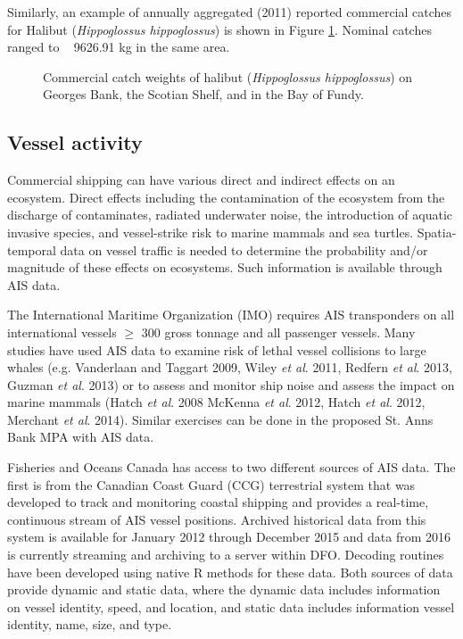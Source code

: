 \documentclass[letterpaper,portrait,11pt]{scrartcl}
\numberwithin{equation}{section}		%
\numberwithin{figure}{section}		%
\numberwithin{table}{section}				%
\newcommand{\ecomod}{\string~/ecomod_data/}   %
\newcommand{\sab}{\ecomod/mpa/sab/}   %
\begin{document}
Similarly, an example of annually aggregated (2011) reported commercial catches for Halibut (\textit{Hippoglossus hippoglossus}) is shown in Figure \ref{fig:halibut}.  Nominal catches ranged to ~ 9626.91 kg in the same area.



\begin{figure}[h]
	\label{fig:halibut}
	\centering
	\caption{Commercial catch weights of halibut (\textit{Hippoglossus hippoglossus}) on Georges Bank, the Scotian Shelf, and in the Bay of Fundy.}
\end{figure}



\clearpage

\subsection{Vessel activity}

Commercial shipping can have various direct and indirect effects on an ecosystem. Direct effects including the contamination of the ecosystem from the discharge of contaminates, radiated underwater noise, the introduction of aquatic invasive species, and vessel-strike risk to marine mammals and sea turtles.  Spatia-temporal data on vessel traffic is needed to determine the probability and/or magnitude of these effects on ecosystems.  Such information is available through AIS data.  

The International Maritime Organization (IMO) requires AIS transponders on all international vessels $\geq$ 300 gross tonnage and all passenger vessels.  Many studies have used AIS data to examine risk of lethal vessel collisions to large whales (e.g. Vanderlaan and Taggart 2009, Wiley \textit{et al}. 2011, Redfern \textit{et al}. 2013,  Guzman \textit{et al}. 2013) or to assess and monitor ship noise and assess the impact on marine mammals (Hatch \textit{et al}. 2008 McKenna \textit{et al}. 2012,  Hatch \textit{et al}. 2012, Merchant \textit{et al}. 2014).    Similar exercises can be done in the proposed St. Anns Bank MPA with AIS data. 

Fisheries and Oceans Canada has access to two different sources of AIS data.  The first is from the Canadian Coast Guard (CCG) terrestrial system that was developed to track and monitoring coastal shipping and provides a real-time, continuous stream of AIS vessel positions.  Archived historical data from this system is available for January 2012 through December 2015 and data from 2016 is currently streaming and archiving to a server within DFO. Decoding routines have been developed using native R methods for these data.   Both sources of data provide dynamic and static data, where the dynamic data includes information on vessel identity, speed, and location, and static data includes information vessel identity, name, size, and type.   
\end{document}
